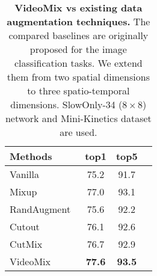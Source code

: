 \begin{table}[t]
\centering
\begin{tabular}{@{}lccc@{}}
\toprule
Methods              & top1  & top5  \\ \midrule
Vanilla      &   75.2 &  91.7    \\
Mixup~\cite{zhang2017mixup}         &   77.0 &  93.1     \\
RandAugment~\cite{randaugment}   &   75.6 &   92.2    \\ 
Cutout~\cite{devries2017cutout}        &   76.1 &  92.6      \\
CutMix~\cite{cutmix}      &  76.7    &  92.9     \\  
\midrule
VideoMix       &  \textbf{77.6}    &  \textbf{93.5} \\
\midrule
\end{tabular}
\caption{\textbf{VideoMix vs existing data augmentation techniques.} The compared baselines are originally proposed for the image classification tasks. We extend them from two spatial dimensions to three spatio-temporal dimensions. SlowOnly-34 ($8\times8$) network and Mini-Kinetics dataset are used. 
}
\label{table:method:analysis}
\end{table}


